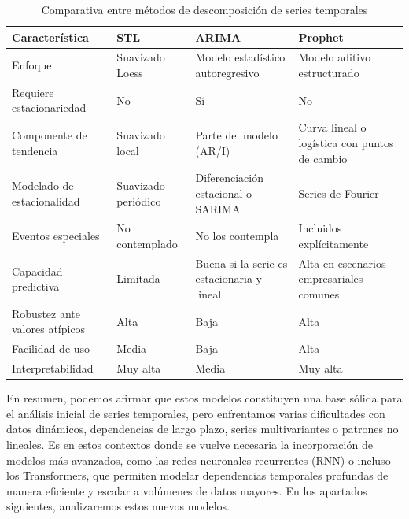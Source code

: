 \begin{table}[H]
    \centering
    \begingroup
    \renewcommand{\arraystretch}{1.055}
    \begin{tabular}{P{3.3cm} | P{2.5cm} P{2.5cm} P{2.5cm}}
        \toprule
        \textbf{Característica}        & \textbf{STL}        & \textbf{ARIMA}                             & \textbf{Prophet}                              \\
        \midrule
        Enfoque                        & Suavizado Loess     & Modelo estadístico autoregresivo           & Modelo aditivo estructurado                   \\
        Requiere estacionariedad       & No                  & Sí                                         & No                                            \\
        Componente de tendencia        & Suavizado local     & Parte del modelo (AR/I)                    & Curva lineal o logística con puntos de cambio \\
        Modelado de estacionalidad     & Suavizado periódico & Diferenciación estacional o SARIMA & Series de Fourier \\
        Eventos especiales             & No contemplado      & No los contempla                           & Incluidos explícitamente                      \\
        Capacidad predictiva           & Limitada            & Buena si la serie es estacionaria y lineal & Alta en escenarios empresariales comunes      \\
        Robustez ante valores atípicos & Alta                & Baja                                       & Alta                                          \\
        Facilidad de uso               & Media               & Baja                                       & Alta                                          \\
        Interpretabilidad              & Muy alta            & Media                                      & Muy alta                                      \\
        \bottomrule
    \end{tabular}
    \caption{Comparativa entre métodos de descomposición de series temporales}
    \label{tab:modelsadit}
    \endgroup
\end{table}



En resumen, podemos afirmar que estos modelos constituyen una base sólida para el análisis inicial de series temporales, pero enfrentamos varias dificultades con datos dinámicos, dependencias de largo plazo, series multivariantes o patrones no lineales. Es en estos contextos donde se vuelve necesaria la incorporación de modelos más avanzados, como las {redes neuronales recurrentes (RNN)} o incluso los {Transformers}, que permiten modelar dependencias temporales profundas de manera eficiente y escalar a volúmenes de datos mayores. En los apartados siguientes, analizaremos estos nuevos modelos.

